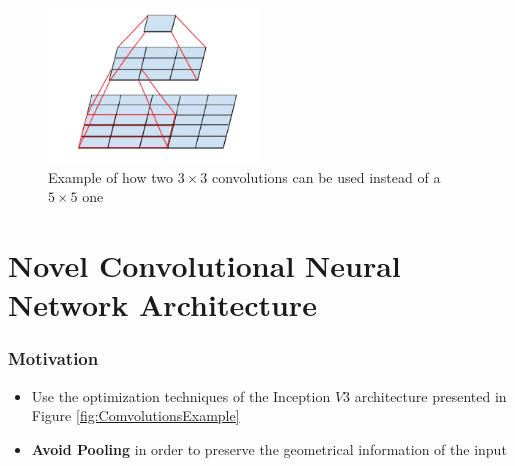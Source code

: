 \documentclass[a0, portrait]{IWIposter}
\begin{document}
\begin{multicols}{3}
\begin{itemize}
\end{itemize}

\begin{figure}[H]
	\centering
	\includegraphics[width=0.5\textwidth]{ConvolutionsExample.png}
	\caption{Example of how two $3 \times 3$ convolutions can be used instead of a $5 \times 5$ one}
	\label{fig:ConvolutionsExample}
\end{figure}



\section*{Novel Convolutional Neural Network Architecture}

\centering
\subsubsection*{Motivation}
	\begin{itemize}
		\item Use the optimization techniques of the Inception $V3$ architecture presented in Figure \ref{fig:ComvolutionsExample}
		\item \textbf{Avoid Pooling} in order to preserve the geometrical information of the input

	\end{itemize}

\centering

\end{multicols}
\end{document}
